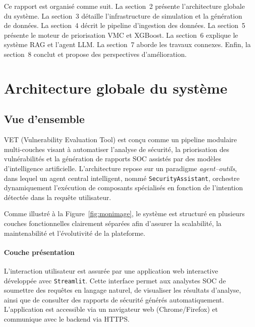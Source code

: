 \documentclass[runningheads]{llncs}
\begin{document}
Ce rapport est organisé comme suit. La section~2 présente l'architecture globale du système. La section~3 détaille l'infrastructure de simulation et la génération de données. La section~4 décrit le pipeline d'ingestion des données. La section~5 présente le moteur de priorisation VMC et XGBoost. La section~6 explique le système RAG et l'agent LLM. La section~7 aborde les travaux connexes. Enfin, la section~8 conclut et propose des perspectives d'amélioration.


\section{Architecture globale du système}

\subsection{Vue d'ensemble}

VET (Vulnerability Evaluation Tool) est conçu comme un pipeline modulaire multi-couches visant à automatiser l’analyse de sécurité, la priorisation des vulnérabilités et la génération de rapports SOC assistés par des modèles d’intelligence artificielle. L’architecture repose sur un paradigme \textit{agent--outils}, dans lequel un agent central intelligent, nommé \texttt{SecurityAssistant}, orchestre dynamiquement l’exécution de composants spécialisés en fonction de l’intention détectée dans la requête utilisateur.

Comme illustré à la Figure~\ref{fig:monimage}, le système est structuré en plusieurs couches fonctionnelles clairement séparées afin d’assurer la scalabilité, la maintenabilité et l’évolutivité de la plateforme.

\paragraph{Couche présentation}
L’interaction utilisateur est assurée par une application web interactive développée avec \texttt{Streamlit}. Cette interface permet aux analystes SOC de soumettre des requêtes en langage naturel, de visualiser les résultats d’analyse, ainsi que de consulter des rapports de sécurité générés automatiquement. L’application est accessible via un navigateur web (Chrome/Firefox) et communique avec le backend via HTTPS.
\end{document}
